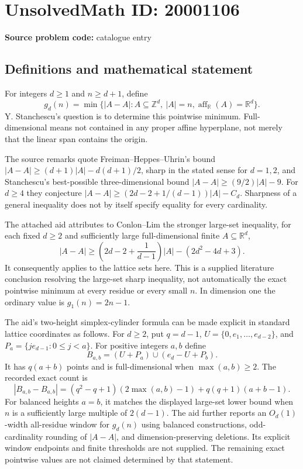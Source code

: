 \documentclass[11pt]{article}
\newcommand{\Z}{\mathbb{Z}}
\newcommand{\R}{\mathbb{R}}
\begin{document}
\section*{UnsolvedMath ID: 20001106}
\textbf{Source problem code:} catalogue entry
\subsection{Definitions and mathematical statement}
For integers $d\geq1$ and $n\geq d+1$, define
\[
 g_d(n)=\min\{|A-A|:A\subseteq\Z^d,\ |A|=n,
 \operatorname{aff}_{\R}(A)=\R^d\}.
\]
Y. Stanchescu's question is to determine this pointwise minimum. Full-dimensional means not contained in any proper affine hyperplane, not merely that the linear span contains the origin.

The source remarks quote Freiman--Heppes--Uhrin's bound
$|A-A|\geq(d+1)|A|-d(d+1)/2$, sharp in the stated sense for $d=1,2$, and Stanchescu's best-possible three-dimensional bound $|A-A|\geq(9/2)|A|-9$. For $d\geq4$ they conjecture $|A-A|\geq(2d-2+1/(d-1))|A|-C_d$. Sharpness of a general inequality does not by itself specify equality for every cardinality.

The attached aid attributes to Conlon--Lim the stronger large-set inequality, for each fixed $d\geq2$ and sufficiently large full-dimensional finite $A\subseteq\R^d$,
\[
 |A-A|\geq\left(2d-2+\frac1{d-1}\right)|A|-(2d^2-4d+3).
\]
It consequently applies to the lattice sets here. This is a supplied literature conclusion resolving the large-set sharp inequality, not automatically the exact pointwise minimum at every residue or every small $n$. In dimension one the ordinary value is $g_1(n)=2n-1$.

The aid's two-height simplex-cylinder formula can be made explicit in standard lattice coordinates as follows. For $d\geq2$, put $q=d-1$, $U=\{0,e_1,\ldots,e_{d-2}\}$, and $P_a=\{je_{d-1}:0\leq j<a\}$. For positive integers $a,b$ define
\[
 B_{a,b}=(U+P_a)\cup(e_d-U+P_b).
\]
It has $q(a+b)$ points and is full-dimensional when $\max(a,b)\geq2$. The recorded exact count is
\[
 |B_{a,b}-B_{a,b}|=(q^2-q+1)(2\max(a,b)-1)+q(q+1)(a+b-1).
\]
For balanced heights $a=b$, it matches the displayed large-set lower bound when $n$ is a sufficiently large multiple of $2(d-1)$. The aid further reports an $O_d(1)$-width all-residue window for $g_d(n)$ using balanced constructions, odd-cardinality rounding of $|A-A|$, and dimension-preserving deletions. Its explicit window endpoints and finite thresholds are not supplied. The remaining exact pointwise values are not claimed determined by that statement.
\end{document}
